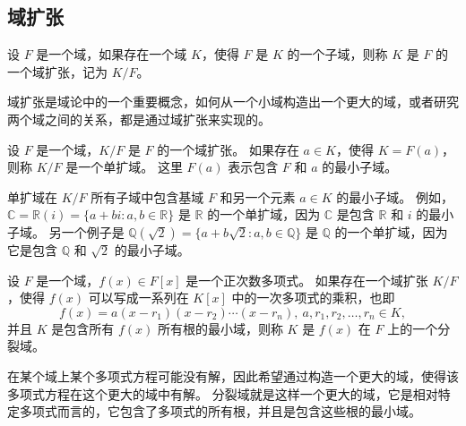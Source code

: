 
\vspace{1em}

\subsection{域扩张}

\begin{definition}
    设 $F$ 是一个域，如果存在一个域 $K$，使得 $F$ 是 $K$ 的一个子域，则称 $K$ 是 $F$ 的一个域扩张，记为 $K/F$。
    \label{def:field_extension}
\end{definition}
\begin{note}
    域扩张是域论中的一个重要概念，如何从一个小域构造出一个更大的域，或者研究两个域之间的关系，都是通过域扩张来实现的。
\end{note}

\begin{definition}
    设 $F$ 是一个域，$K/F$ 是 $F$ 的一个域扩张。
    如果存在 $a\in K$，使得 $K=F(a)$，则称 $K/F$ 是一个单扩域。
    这里 $F(a)$ 表示包含 $F$ 和 $a$ 的最小子域。
    \label{def:simple_extension}
\end{definition}
\begin{note}
    单扩域在 $K/F$ 所有子域中包含基域 $F$ 和另一个元素 $a\in K$ 的最小子域。
    例如，$\mathbb{C}=\mathbb{R}(i)= \{a+bi:a,b\in \mathbb{R}\}$ 是 $\mathbb{R}$ 的一个单扩域，因为 $\mathbb{C}$ 是包含 $\mathbb{R}$ 和 $i$ 的最小子域。
    另一个例子是 $\mathbb{Q}(\sqrt{2}) = \{a+b\sqrt{2}:a,b\in \mathbb{Q}\}$ 是 $\mathbb{Q}$ 的一个单扩域，因为它是包含 $\mathbb{Q}$ 和 $\sqrt{2}$ 的最小子域。
\end{note}

\begin{definition}
    设 $F$ 是一个域，$f(x)\in F[x]$ 是一个正次数多项式。
    如果存在一个域扩张 $K/F$，使得 $f(x)$ 可以写成一系列在 $K[x]$ 中的一次多项式的乘积，也即
    \[
        f(x) = a(x - r_1)(x - r_2) \cdots (x - r_n),\ a,r_1,r_2,\ldots,r_n \in K,
    \]
    并且 $K$ 是包含所有 $f(x)$ 所有根的最小域，则称 $K$ 是 $f(x)$ 在 $F$ 上的一个分裂域。
    \label{def:splitting_field}
\end{definition}
\begin{note}
    在某个域上某个多项式方程可能没有解，因此希望通过构造一个更大的域，使得该多项式方程在这个更大的域中有解。
    分裂域就是这样一个更大的域，它是相对特定多项式而言的，它包含了多项式的所有根，并且是包含这些根的最小域。
\end{note}
\vspace{1em}

